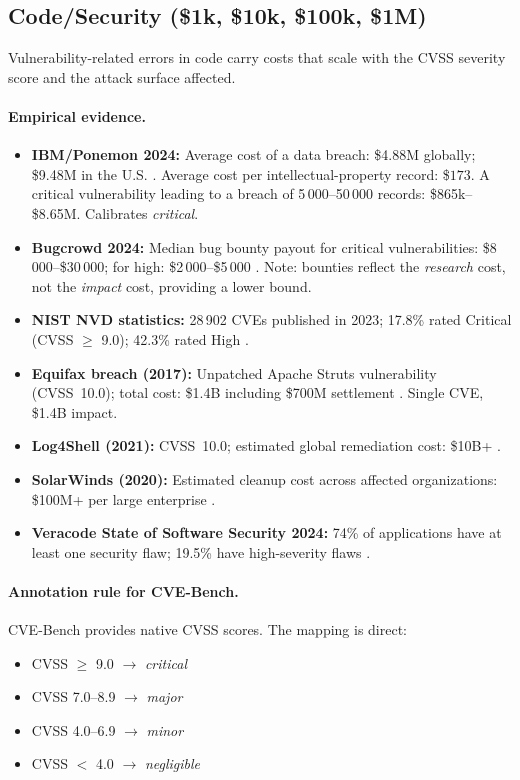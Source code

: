\subsection{Code/Security (\$1k, \$10k, \$100k, \$1M)}

Vulnerability-related errors in code carry costs that scale with
the CVSS severity score and the attack surface affected.

\paragraph{Empirical evidence.}
\begin{itemize}
\item \textbf{IBM/Ponemon 2024:} Average cost of a data breach:
    \$4.88M globally; \$9.48M in the U.S. \citep{ponemon2024}.
    Average cost per intellectual-property record: \$$173$. A critical vulnerability
    leading to a breach of 5\,000--50\,000 records: \$865k--\$8.65M.
    Calibrates \textit{critical}.
\item \textbf{Bugcrowd 2024:} Median bug bounty payout for critical
    vulnerabilities: \$8\,000--\$30\,000; for high: \$2\,000--\$5\,000
    \citep{bugcrowd2024}. Note: bounties reflect the \emph{research}
    cost, not the \emph{impact} cost, providing a lower bound.
\item \textbf{NIST NVD statistics:} 28\,902 CVEs published in 2023;
    17.8\% rated Critical (CVSS $\geq$ 9.0); 42.3\% rated High
    \citep{nist2024nvd}.
\item \textbf{Equifax breach (2017):} Unpatched Apache Struts
    vulnerability (CVSS~10.0); total cost: \$1.4B including \$700M
    settlement \citep{ftc2019equifax}. Single CVE, \$1.4B impact.
\item \textbf{Log4Shell (2021):} CVSS~10.0; estimated global
    remediation cost: \$10B+ \citep{cybereason2022log4shell}.
\item \textbf{SolarWinds (2020):} Estimated cleanup cost across
    affected organizations: \$100M+ per large enterprise
    \citep{solarwinds2021}.
\item \textbf{Veracode State of Software Security 2024:} 74\% of
    applications have at least one security flaw; 19.5\% have
    high-severity flaws \citep{veracode2024}.
\end{itemize}

\paragraph{Annotation rule for CVE-Bench.}
CVE-Bench provides native CVSS scores. The mapping is direct:
\begin{itemize}
\item CVSS $\geq$ 9.0 $\to$ \textit{critical}
\item CVSS 7.0--8.9 $\to$ \textit{major}
\item CVSS 4.0--6.9 $\to$ \textit{minor}
\item CVSS $<$ 4.0 $\to$ \textit{negligible}
\end{itemize}

